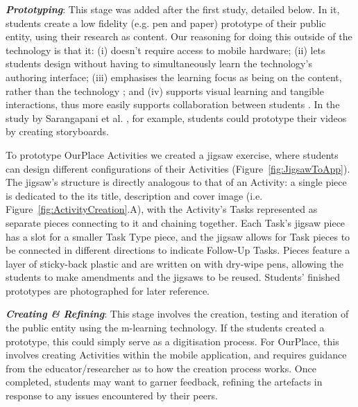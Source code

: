 \documentclass[,hyphens]{sigchi}
\begin{document}
\textit{\textbf{Prototyping}}: This stage was added after the first study, detailed below. In it, students create a low fidelity (e.g. pen and paper) prototype of their public entity, using their research as content. Our reasoning for doing this outside of the technology is that it: (i) doesn't require access to mobile hardware; (ii) lets students design without having to simultaneously learn the technology's authoring interface; (iii) emphasises the learning focus as being on the content, rather than the technology \cite{Bell2010}; and (iv) supports visual learning and tangible interactions, thus more easily supports collaboration between students \cite{Stanton2001}. In the study by Sarangapani et al. \cite{Sarangapani2016}, for example, students could prototype their videos by creating storyboards.

To prototype OurPlace Activities we created a jigsaw exercise, where students can design different configurations of their Activities (Figure~\ref{fig:JigsawToApp}). The jigsaw's structure is directly analogous to that of an Activity: a single piece is dedicated to the its title, description and cover image (i.e. Figure~\ref{fig:ActivityCreation}.A), with the Activity's Tasks represented as separate pieces connecting to it and chaining together. Each Task's jigsaw piece has a slot for a smaller Task Type piece, and the jigsaw allows for Task pieces to be connected in different directions to indicate Follow-Up Tasks. Pieces feature a layer of sticky-back plastic and are written on with dry-wipe pens, allowing the students to make amendments and the jigsaws to be reused. Students' finished prototypes are photographed for later reference.

\textit{\textbf{Creating \& Refining}}: This stage involves the creation, testing and iteration of the public entity using the m-learning technology. If the students created a prototype, this could simply serve as a digitisation process. For OurPlace, this involves creating Activities within the mobile application, and requires guidance from the educator/researcher as to how the creation process works. Once completed, students may want to garner feedback, refining the artefacts in response to any issues encountered by their peers. 
\end{document}
